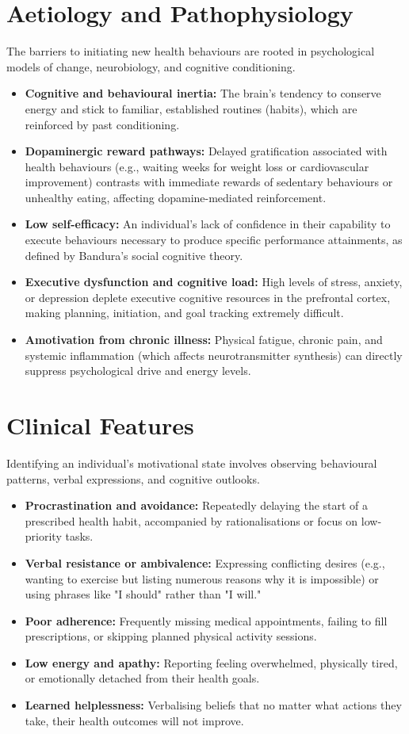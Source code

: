 \section*{Aetiology and Pathophysiology}
The barriers to initiating new health behaviours are rooted in psychological models of change, neurobiology, and cognitive conditioning.
\begin{itemize}
    \item \textbf{Cognitive and behavioural inertia:} The brain's tendency to conserve energy and stick to familiar, established routines (habits), which are reinforced by past conditioning.
    \item \textbf{Dopaminergic reward pathways:} Delayed gratification associated with health behaviours (e.g., waiting weeks for weight loss or cardiovascular improvement) contrasts with immediate rewards of sedentary behaviours or unhealthy eating, affecting dopamine-mediated reinforcement.
    \item \textbf{Low self-efficacy:} An individual's lack of confidence in their capability to execute behaviours necessary to produce specific performance attainments, as defined by Bandura's social cognitive theory.
    \item \textbf{Executive dysfunction and cognitive load:} High levels of stress, anxiety, or depression deplete executive cognitive resources in the prefrontal cortex, making planning, initiation, and goal tracking extremely difficult.
    \item \textbf{Amotivation from chronic illness:} Physical fatigue, chronic pain, and systemic inflammation (which affects neurotransmitter synthesis) can directly suppress psychological drive and energy levels.
\end{itemize}

\section*{Clinical Features}
Identifying an individual's motivational state involves observing behavioural patterns, verbal expressions, and cognitive outlooks.
\begin{itemize}
    \item \textbf{Procrastination and avoidance:} Repeatedly delaying the start of a prescribed health habit, accompanied by rationalisations or focus on low-priority tasks.
    \item \textbf{Verbal resistance or ambivalence:} Expressing conflicting desires (e.g., wanting to exercise but listing numerous reasons why it is impossible) or using phrases like "I should" rather than "I will."
    \item \textbf{Poor adherence:} Frequently missing medical appointments, failing to fill prescriptions, or skipping planned physical activity sessions.
    \item \textbf{Low energy and apathy:} Reporting feeling overwhelmed, physically tired, or emotionally detached from their health goals.
    \item \textbf{Learned helplessness:} Verbalising beliefs that no matter what actions they take, their health outcomes will not improve.
\end{itemize}

